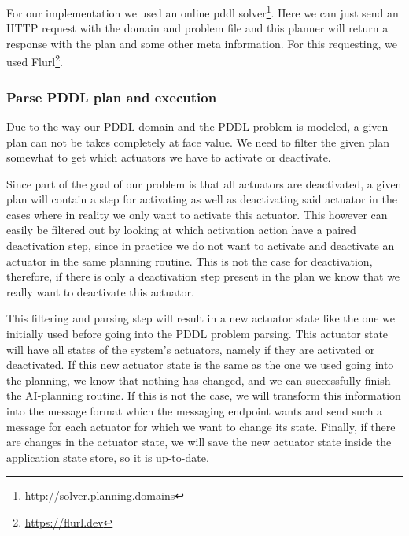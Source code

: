 For our implementation we used an online pddl solver\footnote{\url{http://solver.planning.domains}}.
Here we can just send an HTTP request with the domain and problem file and this planner will return a response with the plan and some other meta information.
For this requesting, we used Flurl\footnote{\url{https://flurl.dev}}.

\subsubsection{Parse PDDL plan and execution}\label{subsubsec:parse-pddl-plan-and-execution}
Due to the way our PDDL domain and the PDDL problem is modeled, a given plan can not be takes completely at face value.
We need to filter the given plan somewhat to get which actuators we have to activate or deactivate.

Since part of the goal of our problem is that all actuators are deactivated, a given plan will contain a step for activating as well as deactivating said actuator in the cases where in reality we only want to activate this actuator.
This however can easily be filtered out by looking at which activation action have a paired deactivation step, since in practice we do not want to activate and deactivate an actuator in the same planning routine.
This is not the case for deactivation, therefore, if there is only a deactivation step present in the plan we know that we really want to deactivate this actuator.

This filtering and parsing step will result in a new actuator state like the one we initially used before going into the PDDL problem parsing.
This actuator state will have all states of the system's actuators, namely if they are activated or deactivated.
If this new actuator state is the same as the one we used going into the planning, we know that nothing has changed, and we can successfully finish the AI-planning routine.
If this is not the case, we will transform this information into the message format which the messaging endpoint wants and send such a message for each actuator for which we want to change its state.
Finally, if there are changes in the actuator state, we will save the new actuator state inside the application state store, so it is up-to-date.
